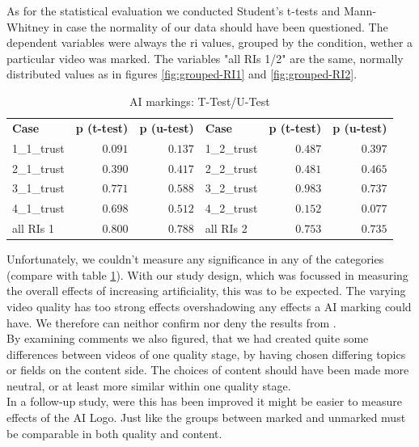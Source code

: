\documentclass[
  a4paper,  %
  twoside,  %
  bibliography=totoc,
  headsepline,
  cleardoublepage=empty,
  parskip=half,
  draft=false
]{scrbook}
\begin{document}
As for the statistical evaluation we conducted Student's t-tests and Mann-Whitney in case the normality of our data should have been questioned. The dependent variables were always the \gls{ri} values, grouped by the condition, wether a particular video was marked. The variables "all RIs 1/2" are the same, normally distributed values as in figures \ref{fig:grouped-RI1} and \ref{fig:grouped-RI2}.
\begin{table}[h]
	\centering
	\caption{AI markings: T-Test/U-Test}
	\label{tab:ttest_logo-trust}
	{
		\begin{tabular}{lrr|lrr}
			\toprule
			\textbf{Case} & \textbf{p (t-test)} & \textbf{p (u-test)} & \textbf{Case} & \textbf{p (t-test)} & \textbf{p (u-test)}  \\
			\cmidrule[0.4pt]{1-6}
			1\_1\_trust & $0.091$ & $0.137$ & 1\_2\_trust & $0.487$ & $0.397$ \\
			2\_1\_trust & $0.390$ & $0.417$ & 2\_2\_trust & $0.481$ & $0.465$ \\
			3\_1\_trust & $0.771$ & $0.588$ & 3\_2\_trust & $0.983$ & $0.737$ \\
			4\_1\_trust & $0.698$ & $0.512$ & 4\_2\_trust & $0.152$ & $0.077$ \\
			all RIs 1 & $0.800$ & $0.788$ & all RIs 2 & $0.753$ & $0.735$\\
			\bottomrule
		\end{tabular}
	}
\end{table}
Unfortunately, we couldn't measure any significance in any of the categories (compare with table \ref{tab:ttest_logo-trust}). With our study design, which was focussed in measuring the overall effects of increasing artificiality, this was to be expected. The varying video quality has too strong effects overshadowing any effects a AI marking could have. We therefore can neithor confirm nor deny the results from .\\
By examining comments we also figured, that we had created quite some differences between videos of one quality stage, by having chosen differing topics or fields on the content side. The choices of content should have been made more neutral, or at least more similar within one quality stage. \\
 In a follow-up study, were this has been improved it might be easier to measure effects of the AI Logo. Just like  the groups between marked and unmarked must be comparable in both quality and content.
\end{document}

